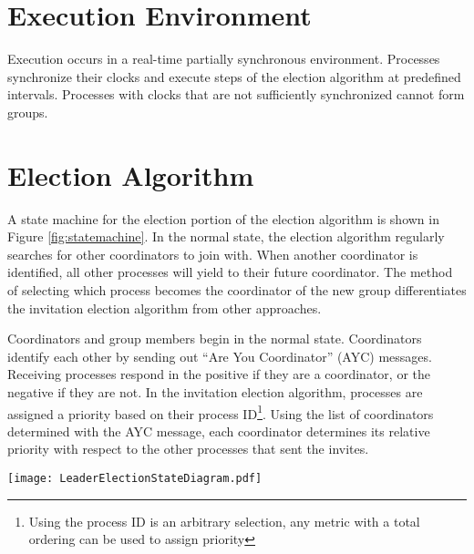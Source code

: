 


\section{Execution Environment}

Execution occurs in a real-time partially synchronous environment.
Processes synchronize their clocks and execute steps of the election algorithm at predefined intervals.
Processes with clocks that are not sufficiently synchronized cannot form groups.

\section{Election Algorithm}

A state machine for the election portion of the election algorithm is shown in Figure \ref{fig:statemachine}.
In the normal state, the election algorithm regularly searches for other coordinators to join with.
When another coordinator is identified, all other processes will yield to their future coordinator.
The method of selecting which process becomes the coordinator of the new group differentiates the invitation election algorithm from other approaches.

Coordinators and group members begin in the normal state.
Coordinators identify each other by sending out ``Are You Coordinator'' (AYC) messages.
Receiving processes respond in the positive if they are a coordinator, or the negative if they are not.
In the invitation election algorithm, processes are assigned a priority based on their process ID\footnote{Using the process ID is an arbitrary selection, any metric with a total ordering can be used to assign priority}.
Using the list of coordinators determined with the AYC message, each coordinator determines its relative priority with respect to the other processes that sent the invites.

\begin{figure*}[!t]
\texttt{[image: LeaderElectionStateDiagram.pdf]}
\caption{State machine of a leader election. Processes start as coordinators in the ``Normal'' state and search for other coordinators to join with. Processes immediately respond to ``Are You Coordinator'' (AYC) messages they receive}
\label{fig:statemachine}
\end{figure*}

